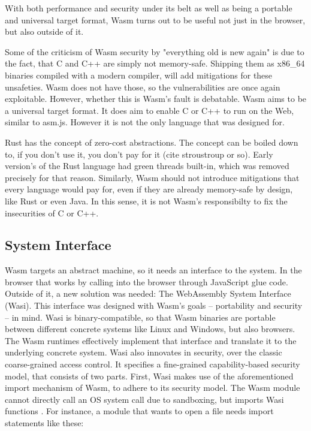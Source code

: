 With both performance and security under its belt as well as being a portable and universal target format, Wasm turns out to be useful not just in the browser, but also outside of it.

Some of the criticism of Wasm security by "everything old is new again" is due to the fact, that C and C++ are simply not memory-safe. Shipping them as x86\_64 binaries compiled with a modern compiler, will add mitigations for these unsafeties. Wasm does not have those, so the vulnerabilities are once again exploitable. However, whether this is Wasm's fault is debatable. Wasm aims to be a universal target format. It does aim to enable C or C++ to run on the Web, similar to asm.js. However it is not the only language that was designed for.

Rust has the concept of zero-cost abstractions. The concept can be boiled down to, if you don't use it, you don't pay for it (cite stroustroup or so). Early version's of the Rust language had green threads built-in, which was removed precisely for that reason. Similarly, Wasm should not introduce mitigations that every language would pay for, even if they are already memory-safe by design, like Rust or even Java. In this sense, it is not Wasm's responsibilty to fix the insecurities of C or C++.

\subsection{System Interface}

Wasm targets an abstract machine, so it needs an interface to the system. In the browser that works by calling into the browser through JavaScript glue code. Outside of it, a new solution was needed: The WebAssembly System Interface (Wasi). This interface was designed with Wasm's goals -- portability and security -- in mind.
Wasi is binary-compatible, so that Wasm binaries are portable between different concrete systems like Linux and Windows, but also browsers. The Wasm runtimes effectively implement that interface and translate it to the underlying concrete system.
Wasi also innovates in security, over the classic coarse-grained access control. It specifies a fine-grained capability-based security model, that consists of two parts. First, Wasi makes use of the aforementioned import mechanism of Wasm, to adhere to its security model. The Wasm module cannot directly call an OS system call due to sandboxing, but imports Wasi functions \cite{Clark2019}. For instance, a module that wants to open a file needs import statements like these:

